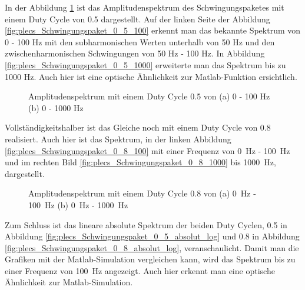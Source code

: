 In der Abbildung \ref{fig:plecs_Schwingungspakete_Amplitudenspektrum_ 0_5_100_1000} ist das Amplitudenspektrum des Schwingungspaketes mit einem Duty Cycle von 0.5 dargestellt. Auf der linken Seite der Abbildung \ref{fig:plecs_Schwingungspaket_0_5_100} erkennt man das bekannte Spektrum von 0 - 100 Hz mit den subharmonischen Werten unterhalb von 50 Hz und den zwischenharmonischen Schwingungen von 50 Hz - 100 Hz. In Abbildung  \ref{fig:plecs_Schwingungspaket_0_5_1000} erweiterte man das Spektrum bis zu 1000 Hz. Auch hier ist eine optische Ähnlichkeit zur  Matlab-Funktion ersichtlich.     
\begin{figure}[ht!]
	\centering
	\qquad
	\caption{Amplitudenspektrum mit einem Duty Cycle 0.5 von (a) 0 - 100 Hz (b) 0 - 1000 Hz}
	\label{fig:plecs_Schwingungspakete_Amplitudenspektrum_ 0_5_100_1000}
\end{figure}


Vollständigkeitshalber ist das Gleiche noch mit einem Duty Cycle von 0.8 realisiert. Auch hier ist das Spektrum, in der linken Abbildung \ref{fig:plecs_Schwingungspaket_0_8_100} mit einer Frequenz von \SI{0}{Hz} - \SI{100}{Hz} und im rechten Bild \ref{fig:plecs_Schwingungspaket_0_8_1000} bis \SI{1000}{Hz}, dargestellt. 


\begin{figure}[ht!]
	\centering
	\qquad
	\caption{Amplitudenspektrum mit einem Duty Cycle 0.8 von (a) \SI{0}{Hz} - \SI{100}{Hz} (b) \SI{0}{Hz} - \SI{1000}{Hz}}
	\label{fig:plecs_Schwingungspakete_Amplitudenspektrum_ 0_8_100_1000}
\end{figure}


Zum Schluss ist das lineare absolute Spektrum der beiden Duty Cyclen, 0.5 in Abbildung \ref{fig:plecs_Schwingungspaket_0_5_absolut_log} und 0.8 in Abbildung \ref{fig:plecs_Schwingungspaket_0_8_absolut_log}, veranschaulicht. Damit man die Grafiken mit der Matlab-Simulation vergleichen kann, wird das Spektrum bis zu einer Frequenz von \SI{100}{Hz} angezeigt. Auch hier erkennt man eine optische Ähnlichkeit zur Matlab-Simulation. 


